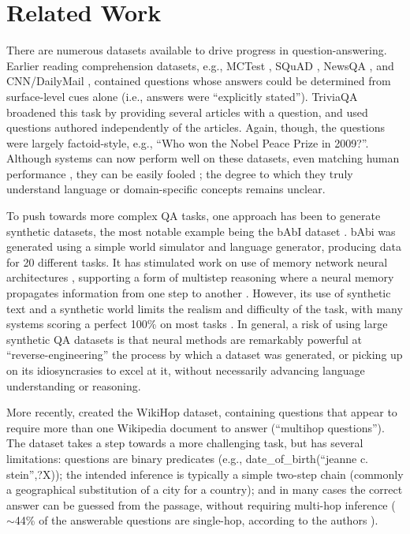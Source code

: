 \section{Related Work}

There are numerous datasets available to drive progress in question-answering.
Earlier reading comprehension datasets, e.g., MCTest \cite{mctest}, SQuAD \cite{rajpurkar2016squad}, NewsQA \cite{trischler2016newsqa},
and CNN/DailyMail \cite{hermann2015teaching}, contained questions whose answers could
be determined from surface-level cues alone (i.e., answers were ``explicitly stated'').
TriviaQA \cite{JoshiTriviaQA2017}
broadened this task by providing several articles with a question, and
used questions authored independently of the articles. Again, though, the
questions were largely factoid-style, e.g., ``Who won the Nobel Peace Prize in 2009?''.
Although systems can now perform well on these datasets,
even matching human performance \cite{human-squad}, they can be easily
fooled \cite{jia2017adversarial}; the degree to which they truly understand
language or domain-specific concepts remains unclear. 

To push towards more complex QA tasks, one approach has been to
generate synthetic datasets, the most notable example being the bAbI dataset \cite{weston2015towards}.
bAbi was generated using a simple world simulator and language generator,
producing data for 20 different tasks. It has stimulated work on
use of memory network neural architectures \cite{weston2014memory},
supporting a form of multistep
reasoning where a neural memory propagates information from one step to another
\cite[e.g.][]{Henaff2016TrackingTW,Seo2017QueryReductionNF}.
However, its use of synthetic text
and a synthetic world limits the realism and difficulty of the task, with
many systems scoring a perfect 100\% on most tasks \cite[e.g.][]{weston2014memory}.
In general, a risk of using large synthetic QA datasets is that neural methods
are remarkably powerful at ``reverse-engineering'' the process by which a
dataset was generated, or picking up on its idiosyncrasies to excel at it,
without necessarily advancing language understanding or reasoning. 

More recently, \citet{welbl2017constructing} created the WikiHop dataset, containing questions
that appear to require more than one Wikipedia document to answer (``multihop questions'').
The dataset takes a step towards a more challenging task, but has several limitations:
questions are binary predicates (e.g., date\_of\_birth(``jeanne c. stein'',?X));
the intended inference is typically a simple two-step chain (commonly
a geographical substitution of a city for a country); and in many cases the
correct answer can be guessed from the passage, without requiring multi-hop
inference ($\sim$44\% of the answerable questions are single-hop, according to the authors \cite{welbl2017constructing}).


